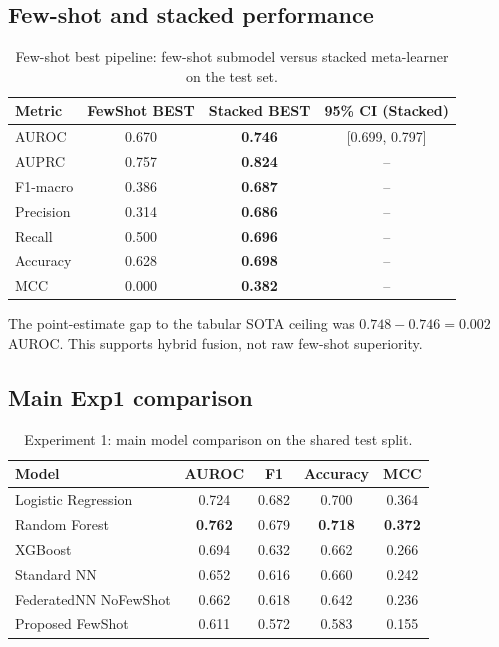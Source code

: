 \documentclass[11pt]{article}
\begin{document}
\subsection{Few-shot and stacked performance}
\begin{table}[H]
\centering
\caption{Few-shot best pipeline: few-shot submodel versus stacked meta-learner on the test set.}
\small
\begin{tabular}{lccc}
\toprule
Metric & FewShot BEST & Stacked BEST & 95\% CI (Stacked) \\
\midrule
AUROC & 0.670 & \textbf{0.746} & [0.699, 0.797] \\
AUPRC & 0.757 & \textbf{0.824} & -- \\
F1-macro & 0.386 & \textbf{0.687} & -- \\
Precision & 0.314 & \textbf{0.686} & -- \\
Recall & 0.500 & \textbf{0.696} & -- \\
Accuracy & 0.628 & \textbf{0.698} & -- \\
MCC & 0.000 & \textbf{0.382} & -- \\
\bottomrule
\end{tabular}
\label{tab:fewshot-stacked}
\end{table}

The point-estimate gap to the tabular SOTA ceiling was $0.748-0.746=0.002$ AUROC. This supports hybrid fusion, not raw few-shot superiority.

\subsection{Main Exp1 comparison}
\begin{table}[H]
\centering
\caption{Experiment 1: main model comparison on the shared test split.}
\small
\begin{tabular}{lcccc}
\toprule
Model & AUROC & F1 & Accuracy & MCC \\
\midrule
Logistic Regression & 0.724 & 0.682 & 0.700 & 0.364 \\
Random Forest & \textbf{0.762} & 0.679 & \textbf{0.718} & \textbf{0.372} \\
XGBoost & 0.694 & 0.632 & 0.662 & 0.266 \\
Standard NN & 0.652 & 0.616 & 0.660 & 0.242 \\
FederatedNN NoFewShot & 0.662 & 0.618 & 0.642 & 0.236 \\
Proposed FewShot & 0.611 & 0.572 & 0.583 & 0.155 \\
\bottomrule
\end{tabular}
\label{tab:exp1}
\end{table}
\end{document}
